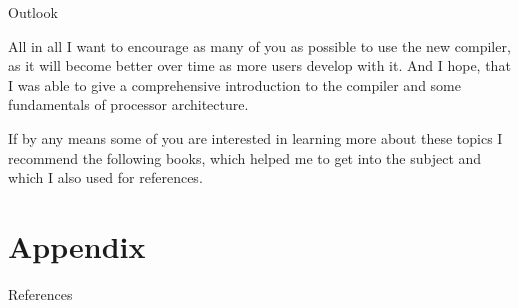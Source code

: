 \documentclass[10pt,aspectratio=169]{beamer}
\begin{document}
\begin{frame}[fragile]{Outlook}
{		All in all I want to encourage as many of you as possible to use the new compiler, as it will become better over time as more users develop with it.
		And I hope, that I was able to give a comprehensive introduction to the compiler and some fundamentals of processor architecture.

		If by any means some of you are interested in learning more about these topics I recommend the following books, which helped me to get into the subject and which I also used for references.
		
}
\end{frame}

\appendix

\section{Appendix}
\scriptsize
\nocite{microprocessor}
\nocite{UBHD-67548259}
\nocite{UBHD-66483012}
\nocite{nuxmanual}
\nocite{GCCint}
\begin{frame}[fragile]{References}


\end{frame}
\end{document}
